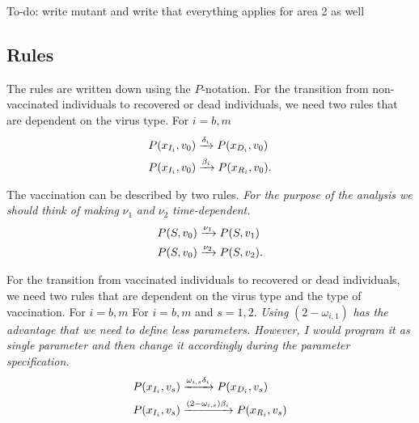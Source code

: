 To-do: write mutant and write that everything applies for area 2 as well



\subsection{Rules}
The rules are written down using the $P$-notation. For the transition from non-vaccinated individuals to recovered or dead individuals, we need two rules that are dependent on the virus type. For $i = b,m$
\begin{align}
    P(x_{I_i},  v_0) &\xrightarrow{\delta_i} P(x_{D_i}, v_0) \\
    P(x_{I_i},  v_0) &\xrightarrow{\beta_i} P(x_{R_i},  v_0).\notag
\end{align}

The vaccination can be described by two rules. \textit{For the purpose of the analysis we should think of making} $\nu_1$ \textit{and} $\nu_2$ \textit{time-dependent.}
\begin{align}
    P(S, v_0) &\xrightarrow{\nu_1} P(S, v_1) \\
    P(S, v_0) &\xrightarrow{\nu_2} P(S, v_2).\notag
\end{align}

For the transition from vaccinated individuals to recovered or dead individuals, we need two rules that are dependent on the virus type and the type of vaccination. For $i = b,m$ For $i = b,m$ and $s = 1,2$. \textit{Using} $(2-\omega_{i,1})$ \textit{has the advantage that we need to define less parameters. However, I would program it as single parameter and then change it accordingly during the parameter specification.}
\begin{align}
    P(x_{I_i},  v_s) &\xrightarrow{\omega_{i,s} \delta_i} P(x_{D_i}, v_s) \\
    P(x_{I_i}, v_s) &\xrightarrow{(2-\omega_{i,s})\beta_i} P(x_{R_i}, v_s)\notag
\end{align}

